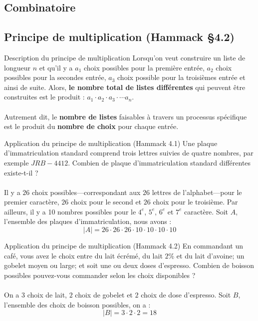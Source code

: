 \documentclass[8pt]{report}
\begin{document}
\begin{multicols*}{2}
\chapter{Combinatoire}
\section{Principe de multiplication (Hammack \S 4.2)}
\begin{Concept}{Description du principe de multiplication}{}
    Lorsqu'on veut construire un liste de longueur $n$ et qu'il y a $a_1$ choix possibles pour la première entrée, 
    $a_2$ choix possibles pour la secondes entrée, $a_3$ choix possible pour la troisièmes entrée et ainsi de suite. 
    Alors, \textbf{le nombre total de listes différentes} qui peuvent être construites est le produit :
    $a_1 \cdot a_2 \cdot a_3 \cdot \cdots a_n$. \\\\ 
    Autrement dit, le \textbf{nombre de listes} faisables à travers un processus spécifique est le produit 
    du \textbf{nombre de choix} pour chaque entrée.   
\end{Concept}
\begin{EExample}{Application du principe de multiplication (Hammack 4.1)}{}
    Une plaque d'immatriculation standard comprend trois lettres suivies de quatre nombres, par exemple 
    $JRB-4412$. Combien de plaque d'immatriculation standard différentes existe-t-il ? \\\\
    Il y a $26$ choix possibles—correspondant aux $26$ lettres de l'alphabet—pour le premier caractère, 
    $26$ choix pour le second et $26$ choix pour le troisième. Par ailleurs, il y a 10 nombres possibles pour 
    le $4^e$, $5^e$, $6^e$ et $7^e$ caractère. Soit $A$, l'ensemble des plaques d'immatriculation, nous avons :
    \[ |A| = 26 \cdot 26 \cdot 26 \cdot 10 \cdot 10 \cdot 10 \cdot 10 \]
\end{EExample}

\begin{EExample}{Application du principe de multiplication (Hammack 4.2)}{}
    En commandant un café, vous avez le choix entre du lait écrémé, du lait $2\%$ et du lait d'avoine; 
    un gobelet moyen ou large; et soit une ou deux doses d'espresso. Combien de boisson possibles 
    pouvez-vous commander selon les choix disponibles ? \\\\ 
    On a $3$ choix de lait, $2$ choix de gobelet et $2$ choix de dose d'espresso. Soit $B$, l'ensemble des 
    choix de boisson possibles, on a :
    \[ |B| = 3 \cdot 2 \cdot 2 = 18 \]
\end{EExample}


\end{multicols*}
\end{document}
